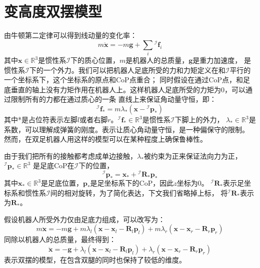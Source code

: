 \section{变高度双摆模型}
由牛顿第二定律可以得到线动量的变化率：
\begin{equation}
    \label{equ:newton_2}
    m \ddot{\boldsymbol{x}}=-m \boldsymbol{g}+\sum_i{ }^{\mathcal{I}} \boldsymbol{f}_i
\end{equation}
其中$\boldsymbol{x} \in \mathbb{R}^{3}$是惯性系$\mathcal{I}$下的质心位置，$m$是机器人的总质量，$\boldsymbol{g}$是重力加速度， 
是惯性系$\mathcal{I}$下的一个外力。我们可以把机器人足底所受的力和力矩定义在和$\mathcal{I}$平行的一个坐标系下，这个坐标系的原点和CoP点重合；
同时假设在通过CoP点，和足底垂直的轴上没有力矩作用在机器人上。这样机器人足底所受的力矩为0，可以通过限制所有的力都在通过质心的一条
直线上来保证角动量守恒，即：
\begin{equation}
    \label{equ:linear_f}
    { }^{\mathcal{I}} \boldsymbol{f}_*=m \lambda_*\left(\boldsymbol{x}-{ }^{\mathcal{I}} \boldsymbol{p}_*\right)
\end{equation}
其中*是占位符表示左脚$l$或者右脚$r$。${ }^{\mathcal{I}} \boldsymbol{f}_* \in \mathbb{R}^{3}$是惯性系$\mathcal{I}$下脚上的外力，
$\lambda_* \in \mathbb{R}^{3}$是系数，可以理解成弹簧的刚度。表示让质心角动量守恒，是一种偏保守的限制。
然而，在双足机器人用这样的模型可以在某种程度上确保鲁棒性。

由于我们把所有的接触都考虑成单边接触，$\lambda_*$被约束为正来保证法向力为正，${ }^{\mathcal{I}} \boldsymbol{p}_* \in \mathbb{R}^{3}$
是足底CoP在$\mathcal{I}$下的位置，
\begin{equation}
    \label{equ:cop}
    { }^{\mathcal{I}} \boldsymbol{p}_*=\boldsymbol{x}_*+{ }^{\mathcal{I}} \boldsymbol{R}_* \boldsymbol{p}_*
\end{equation}
其中$\boldsymbol{x}_* \in \mathbb{R}^{3}$是足底位置，$\boldsymbol{p}_*$是足坐标系下的CoP，因此$z$坐标为0。
${ }^{\mathcal{I}} \boldsymbol{R}_*$表示足坐标系和惯性系$\mathcal{I}$间的相对旋转，为了简化表达，下文我们省略掉上标，
将${ }^{\mathcal{I}} \boldsymbol{R}_*$表示为$\boldsymbol{R}_*$。

假设机器人所受外力仅由足底力组成，可以改写为：
\begin{equation}
    \label{equ:newton_linear_1}
    m \ddot{\boldsymbol{x}}= -m \boldsymbol{g}+m \lambda_l\left(\boldsymbol{x}-\boldsymbol{x}_l-\boldsymbol{R}_l \boldsymbol{p}_l\right)
    +m \lambda_r\left(\boldsymbol{x}-\boldsymbol{x}_r-\boldsymbol{R}_r \boldsymbol{p}_r\right)
\end{equation}
同除以机器人的总质量，最终得到：
\begin{equation}
    \label{equ:newton_linear_2}
    \ddot{\boldsymbol{x}}= -\boldsymbol{g}+\lambda_l\left(\boldsymbol{x}-\boldsymbol{x}_l-\boldsymbol{R}_l \boldsymbol{p}_l\right) 
        +\lambda_r\left(\boldsymbol{x}-\boldsymbol{x}_r-\boldsymbol{R}_r \boldsymbol{p}_r\right)
\end{equation}
表示双摆的模型，在包含双腿的同时也保持了较低的维度。

